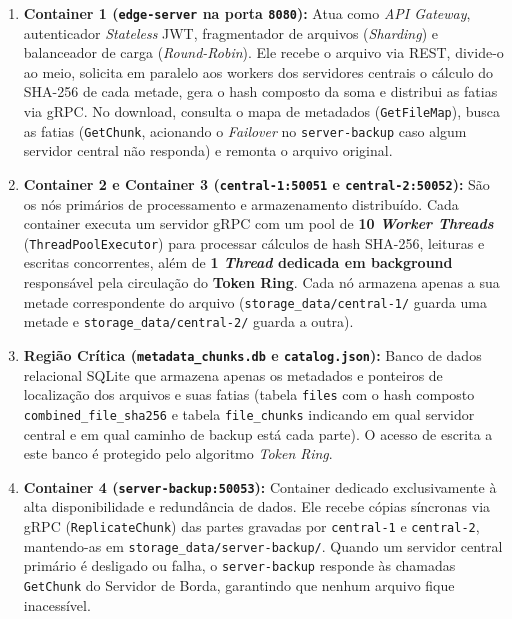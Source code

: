 \documentclass[12pt]{article}
\begin{document}
\begin{enumerate}
    \item \textbf{Container 1 (\texttt{edge-server} na porta \texttt{8080}):}
    Atua como \textit{API Gateway}, autenticador \textit{Stateless} JWT, fragmentador de arquivos (\textit{Sharding}) e balanceador de carga (\textit{Round-Robin}). Ele recebe o arquivo via REST, divide-o ao meio, solicita em paralelo aos workers dos servidores centrais o cálculo do SHA-256 de cada metade, gera o hash composto da soma e distribui as fatias via gRPC. No download, consulta o mapa de metadados (\texttt{GetFileMap}), busca as fatias (\texttt{GetChunk}, acionando o \textit{Failover} no \texttt{server-backup} caso algum servidor central não responda) e remonta o arquivo original.

    \item \textbf{Container 2 e Container 3 (\texttt{central-1:50051} e \texttt{central-2:50052}):}
    São os nós primários de processamento e armazenamento distribuído. Cada container executa um servidor gRPC com um pool de \textbf{10 \textit{Worker Threads}} (\texttt{ThreadPoolExecutor}) para processar cálculos de hash SHA-256, leituras e escritas concorrentes, além de \textbf{1 \textit{Thread} dedicada em background} responsável pela circulação do \textbf{Token Ring}. Cada nó armazena apenas a sua metade correspondente do arquivo (\texttt{storage\_data/central-1/} guarda uma metade e \texttt{storage\_data/central-2/} guarda a outra).

    \item \textbf{Região Crítica (\texttt{metadata\_chunks.db} e \texttt{catalog.json}):}
    Banco de dados relacional SQLite que armazena apenas os metadados e ponteiros de localização dos arquivos e suas fatias (tabela \texttt{files} com o hash composto \texttt{combined\_file\_sha256} e tabela \texttt{file\_chunks} indicando em qual servidor central e em qual caminho de backup está cada parte). O acesso de escrita a este banco é protegido pelo algoritmo \textit{Token Ring}.

    \item \textbf{Container 4 (\texttt{server-backup:50053}):}
    Container dedicado exclusivamente à alta disponibilidade e redundância de dados. Ele recebe cópias síncronas via gRPC (\texttt{ReplicateChunk}) das partes gravadas por \texttt{central-1} e \texttt{central-2}, mantendo-as em \texttt{storage\_data/server-backup/}. Quando um servidor central primário é desligado ou falha, o \texttt{server-backup} responde às chamadas \texttt{GetChunk} do Servidor de Borda, garantindo que nenhum arquivo fique inacessível.
\end{enumerate}
\end{document}
